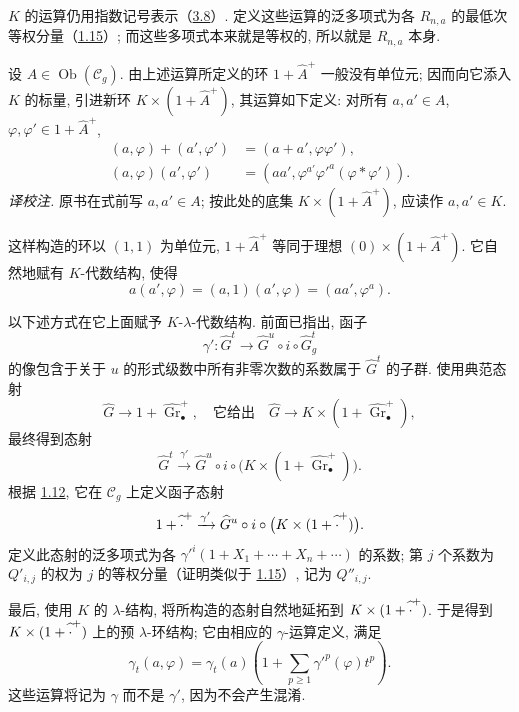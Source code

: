 \(K\) 的运算仍用指数记号表示（\hyperlink{sga6.e05.para.3-8}{3.8}）. 定义这些运算的泛多项式为各 \(R_{n,a}\) 的最低次等权分量（\hyperlink{sga6.e05.para.1-15}{1.15}）; 而这些多项式本来就是等权的, 所以就是 \(R_{n,a}\) 本身.

设 \(A\in\operatorname{Ob}(\mathcal C_g)\). 由上述运算所定义的环 \(1+\widehat A^+\) 一般没有单位元; 因而向它添入 \(K\) 的标量, 引进新环 \(K\times(1+\widehat A^+)\), 其运算如下定义: 对所有 \(a,a'\in A\), \(\varphi,\varphi'\in1+\widehat A^+\),
\begin{equation}\tag{6.1.2}
 \begin{aligned}
 (a,\varphi)+(a',\varphi')&=(a+a',\varphi\varphi'),\\
 (a,\varphi)(a',\varphi')&=
   (aa',\varphi^{a'}\varphi'^{a}(\varphi*\varphi')).
 \end{aligned}
\end{equation}
\emph{译校注.} 原书在式前写 \(a,a'\in A\); 按此处的底集 \(K\times(1+\widehat A^+)\), 应读作 \(a,a'\in K\).

这样构造的环以 \((1,1)\) 为单位元, \(1+\widehat A^+\) 等同于理想 \((0)\times(1+\widehat A^+)\). 它自然地赋有 \(K\)-代数结构, 使得
\begin{equation}\tag{6.1.3}
 a(a',\varphi)=(a,1)(a',\varphi)=(aa',\varphi^a).
\end{equation}

以下述方式在它上面赋予 \(K\)-\(\lambda\)-代数结构. 前面已指出, 函子
\[
 \gamma':\widehat G^t\longrightarrow
 \widehat G^u\circ i\circ\widehat G^t_g
\]
的像包含于关于 \(u\) 的形式级数中所有非零次数的系数属于 \(\widehat G^t\) 的子群. 使用典范态射
\[
 \widehat G\longrightarrow1+\widehat{\operatorname{Gr}}_{\bullet}^{+},
 \quad\text{它给出}\quad
 \widehat G\longrightarrow K\times
          (1+\widehat{\operatorname{Gr}}_{\bullet}^{+}),
\]
最终得到态射
\[
 \widehat G^t\xrightarrow{\gamma'}
 \widehat G^u\circ i\circ
      \bigl(K\times(1+\widehat{\operatorname{Gr}}_{\bullet}^{+})\bigr).
\]
根据 \hyperlink{sga6.e05.lem.1-12}{1.12}, 它在 \(\mathcal C_g\) 上定义函子态射
\[
 1+\widehat{\vphantom A\cdot}^{+}\xrightarrow{\gamma'}
 \widehat G^u\circ i\circ
      \bigl(K\times(1+\widehat{\vphantom A\cdot}^{+})\bigr).
\]
定义此态射的泛多项式为各 \(\gamma'^i(1+X_1+\cdots+X_n+\cdots)\) 的系数; 第 \(j\) 个系数为 \(Q'_{i,j}\) 的权为 \(j\) 的等权分量（证明类似于 \hyperlink{sga6.e05.para.1-15}{1.15}）, 记为 \(Q''_{i,j}\).

最后, 使用 \(K\) 的 \(\lambda\)-结构, 将所构造的态射自然地延拓到 \(K\times(1+\widehat{\vphantom A\cdot}^{+})\). 于是得到 \(K\times(1+\widehat{\vphantom A\cdot}^{+})\) 上的预 \(\lambda\)-环结构; 它由相应的 \(\gamma\)-运算定义, 满足
\begin{equation}\tag{6.1.4}
 \gamma_t(a,\varphi)=\gamma_t(a)
      \left(1+\sum_{p\ge1}\gamma'^p(\varphi)t^p\right).
\end{equation}
这些运算将记为 \(\gamma\) 而不是 \(\gamma'\), 因为不会产生混淆.

